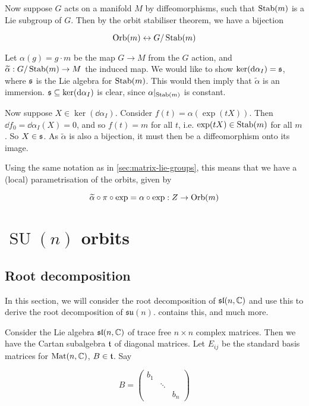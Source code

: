 \documentclass{report}
\DeclareMathOperator{\SU}{SU}
\newcommand{\su}{\mathfrak{su}}
\renewcommand{\sl}{\mathfrak{sl}}
\renewcommand{\tilde}{\widetilde}
\begin{document}
Now suppose \(G\) acts on a manifold \(M\) by diffeomorphisms, such that \(\operatorname{Stab}(m)\) is a Lie subgroup of \(G\). Then by the orbit stabiliser theorem, we have a bijection

\[\operatorname{Orb}(m) \leftrightarrow G/\operatorname{Stab}(m)\]

Let \(\alpha(g) = g \cdot m\) be the map \(G \to M\) from the \(G\) action, and \(\tilde\alpha : G/\Stab(m) \to M\) the induced map. We would like to show \(\ker(\dd\alpha_I) = \mathfrak{s}\), where \(\mathfrak{s}\) is the Lie algebra for \(\operatorname{Stab}(m)\). This would then imply that \(\tilde\alpha\) is an immersion. \(\mathfrak{s} \subseteq \ker(\dd\alpha_I)\) is clear, since \(\alpha\vert_{\operatorname{Stab}(m)}\) is constant.

Now suppose \(X \in \ker(\dd\alpha_I)\). Consider \(f(t) = \alpha(\exp(tX))\). Then \(\dd f_0 = \dd \alpha_I(X) = 0\), and so \(f(t) = m\) for all \(t\), i.e. \(\exp(tX) \in \operatorname{Stab}(m)\) for all \(m\). So \(X \in \mathfrak{s}\). As \(\tilde\alpha\) is also a bijection, it must then be a diffeomorphism onto its image.

Using the same notation as in \cref{sec:matrix-lie-groups}, this means that we have a (local) parametrisation of the orbits, given by

\begin{equation}
    \label{eq:param}
    \tilde\alpha \circ \pi \circ \exp = \alpha \circ \exp : Z \to \Orb(m)
\end{equation}

\chapter{\(\SU(n)\) orbits}

\section{Root decomposition}

\label{sec:root}

In this section, we will consider the root decomposition of \(\sl(n, \C)\) and use this to derive the root decomposition of \(\su(n)\).  \cite[\S 8]{humphreys} contains this, and much more.

Consider the Lie algebra \(\sl(n, \C)\) of trace free \(n \times n\) complex matrices. Then we have the Cartan subalgebra \(\mathfrak{t}\) of diagonal matrices. Let \(E_{ij}\) be the standard basis matrices for \(\operatorname{Mat}(n, \mathbb{C})\), \(B \in \mathfrak{t}\). Say

\[B = \begin{pmatrix}
    b_1 \\
    & \ddots \\
    & & b_n
\end{pmatrix}\]
\end{document}
